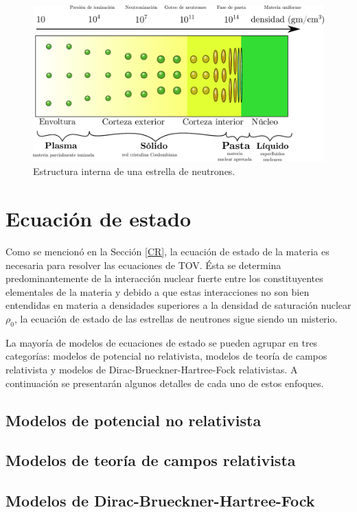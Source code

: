 \begin{figure}[H]
    \centering
    \includegraphics[width=420pt]{figures/Density.pdf}
    \caption[Estructura interna de una estrella de neutrones]{Estructura interna de una estrella de neutrones.\protect\footnotemark}
    \label{NSS}
\end{figure}

\section{Ecuación de estado}

Como se mencionó en la Sección \ref{CR}, la ecuación de estado de la materia es necesaria para resolver las ecuaciones de TOV. Ésta se determina predominantemente de la interacción nuclear fuerte entre los constituyentes elementales de la materia y debido a que estas interacciones no son bien entendidas en materia a densidades superiores a la densidad de saturación nuclear $\rho_0$, la ecuación de estado de las estrellas de neutrones sigue siendo un misterio.

La mayoría de modelos de ecuaciones de estado se pueden agrupar en tres categorías: modelos de potencial no relativista, modelos de teoría de campos relativista y modelos de Dirac-Brueckner-Hartree-Fock relativistas. A continuación se presentarán algunos detalles de cada uno de estos enfoques.

\subsection{Modelos de potencial no relativista}
\subsection{Modelos de teoría de campos relativista}
\subsection{Modelos de Dirac-Brueckner-Hartree-Fock}